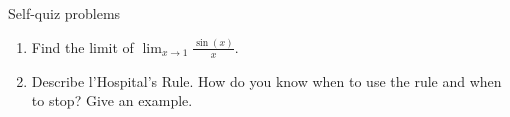 \begin{frame}{Self-quiz problems}
\begin{enumerate}	

\item<handout:0>	Find the limit of   $\displaystyle \lim_{x \to 1} \frac{\sin(x)}{x}$.




\item<handout:0>	Describe l'Hospital’s Rule. How do you know when to use the rule
	and when to stop? Give an example.

\end{enumerate}
	
\end{frame}
	
